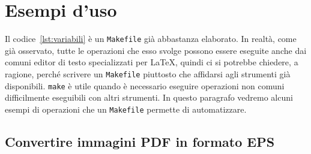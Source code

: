 \cleardoublepage{}
\chapter{Esempi d'uso}
\label{cha:esempi}

Il codice~\ref{lst:variabili} è un \texttt{Makefile} già abbastanza elaborato.
In realtà, come già osservato, tutte le operazioni che esso svolge possono
essere eseguite anche dai comuni editor di testo specializzati per \LaTeX{},
quindi ci si potrebbe chiedere, a ragione, perché scrivere un \texttt{Makefile}
piuttosto che affidarsi agli strumenti già disponibili.  \texttt{make} è utile
quando è necessario eseguire operazioni non comuni difficilmente eseguibili con
altri strumenti.  In questo paragrafo vedremo alcuni esempi di operazioni che un
\texttt{Makefile} permette di automatizzare.

\section{Convertire immagini \textsc{PDF} in formato \textsc{EPS}}
\label{sec:immagini-eps}

